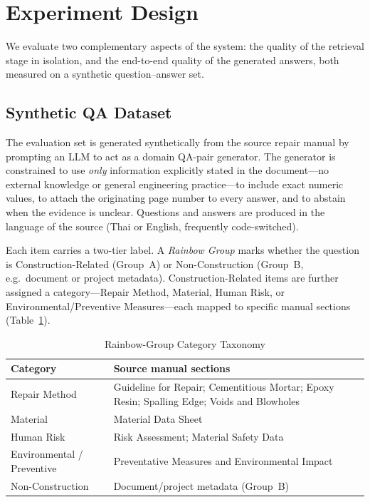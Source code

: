 \documentclass[10pt,a4paper,conference]{IEEEtran}
\begin{document}
\section{Experiment Design}
We evaluate two complementary aspects of the system: the quality of the
retrieval stage in isolation, and the end-to-end quality of the generated
answers, both measured on a synthetic question--answer set.

\subsection{Synthetic QA Dataset}
The evaluation set is generated synthetically from the source repair manual by
prompting an LLM to act as a domain QA-pair generator. The generator is
constrained to use \emph{only} information explicitly stated in the
document---no external knowledge or general engineering practice---to include
exact numeric values, to attach the originating page number to every answer,
and to abstain when the evidence is unclear. Questions and answers are produced
in the language of the source (Thai or English, frequently code-switched).

Each item carries a two-tier label. A \emph{Rainbow Group} marks whether the
question is Construction-Related (Group~A) or Non-Construction (Group~B, e.g.\
document or project metadata). Construction-Related items are further assigned a
category---Repair Method, Material, Human Risk, or Environmental/Preventive
Measures---each mapped to specific manual sections (Table~\ref{tab:taxonomy}).

\begin{table}[htbp]
\caption{Rainbow-Group Category Taxonomy}
\begin{center}
\footnotesize
\begin{tabular}{|p{}|p{}|}
\hline
\textbf{Category} & \textbf{Source manual sections} \\
\hline
Repair Method & Guideline for Repair; Cementitious Mortar; Epoxy Resin; Spalling Edge; Voids and Blowholes \\
\hline
Material & Material Data Sheet \\
\hline
Human Risk & Risk Assessment; Material Safety Data \\
\hline
Environmental / Preventive & Preventative Measures and Environmental Impact \\
\hline
Non-Construction & Document/project metadata (Group~B) \\
\hline
\end{tabular}
\label{tab:taxonomy}
\end{center}
\end{table}
\end{document}
